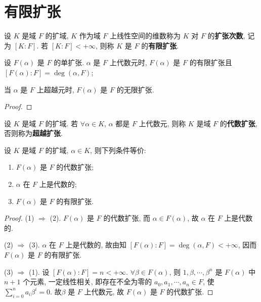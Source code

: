 \documentclass[../../main.tex]{subfiles}%
\begin{document}
\section{有限扩张}

\begin{definition}
设 $K$ 是域 $F$ 的扩域, $K$ 作为域 $F$ 上线性空间的维数称为 $K$ 对 $F$ 的\textbf{扩张次数}, 记为 $[K:F]$. 若 $[K:F]<+\infty$, 则称 $K$ 是 $F$ 的\textbf{有限扩张}.
\end{definition}

\begin{proposition}
设 $F(\alpha)$ 是 $F$ 的单扩张. $\alpha$ 是 $F$ 上代数元时, $F(\alpha)$ 是 $F$ 的有限扩张且 $[F(\alpha):F]=\deg(\alpha,F)$;

当 $\alpha$ 是 $F$ 上超越元时, $F(\alpha)$ 是 $F$ 的无限扩张.
\end{proposition}
\begin{proof}

\end{proof}

\begin{definition}
设 $K$ 是域 $F$ 的扩域. 若 $\forall \alpha\in K$, $\alpha$ 都是 $F$ 上代数元, 则称 $K$ 是域 $F$ 的\textbf{代数扩张}, 否则称为\textbf{超越扩张}.
\end{definition}

\begin{theorem}\label{theorem:定理3.2.1--抽象代数}
设 $K$ 是域 $F$ 的扩域, $\alpha\in K$, 则下列条件等价:
\begin{enumerate}[(1)]
\item $F(\alpha)$ 是 $F$ 的代数扩张;
\item $\alpha$ 在 $F$ 上是代数的;
\item $F(\alpha)$ 是 $F$ 的有限扩张.
\end{enumerate}
\end{theorem}
\begin{proof}
(1) $\Rightarrow$ (2). $F(\alpha)$ 是 $F$ 的代数扩张, 而 $\alpha\in F(\alpha)$, 故 $\alpha$ 在 $F$ 上是代数的.

(2) $\Rightarrow$ (3). $\alpha$ 在 $F$ 上是代数的, 故由知 $[F(\alpha):F]=\deg(\alpha,F)<+\infty$, 因而 $F(\alpha)$ 是 $F$ 的有限扩张.

(3) $\Rightarrow$ (1). 设 $[F(\alpha):F]=n<+\infty$. $\forall \beta\in F(\alpha)$, 则 $1,\beta,\cdots,\beta^n$ 是 $F(\alpha)$ 中 $n+1$ 个元素, 一定线性相关, 即存在不全为零的 $a_0,a_1,\cdots,a_n\in F$, 使 $\sum\limits_{i=0}^{n}a_i\beta^i=0$. 故$\beta$ 是 $F$ 上代数元, 故 $F(\alpha)$ 是 $F$ 的代数扩张.

\end{proof}
\end{document}
